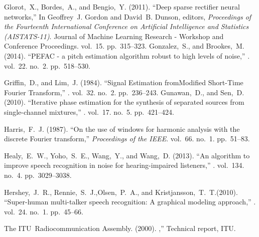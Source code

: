  Glorot,~X., Bordes,~A., and Bengio,~Y. (2011).
\newblock ``Deep sparse rectifier neural networks,'' \newblock In Geoffrey~J. Gordon
and David~B. Dunson, editors, {\em Proceedings of the Fourteenth International
Conference on Artificial Intelligence and Statistics (AISTATS-11)}. Journal of Machine Learning Research - Workshop and Conference
Proceedings. vol.~15. pp.~315--323.
 Gonzalez,~S., and Brookes,~M. (2014).
\newblock ``{PEFAC} - a pitch estimation algorithm robust to high levels of
noise,'' . vol.~22. no.~2. pp.~518--530.

 Griffin,~D., and Lim,~J. (1984). \newblock ``Signal
Estimation fromModified Short-Time Fourier Transform,'' . vol.~32. no.~2. pp.~236--243.
% 
 Gunawan,~D., and Sen,~D. (2010). \newblock
``{Iterative phase estimation for the synthesis of separated sources from
single-channel mixtures},'' .
vol.~17. no.~5. pp.~421--424.

 Harris,~F.~J. (1987). \newblock ``On the use of
windows for harmonic analysis with the discrete {Fourier} transform,'' \newblock
{\em Proceedings of the IEEE}. vol.~66. no.~1. pp.~51--83.

 Healy,~E.~W., Yoho,~S.~E., Wang,~Y., and Wang,~D. (2013).
\newblock ``{An algorithm to improve speech recognition in noise for
hearing-impaired listeners},'' . vol.~134. no.~4. pp.~3029--3038.

 Hershey,~J.~R., Rennie,~S.~J.,Olsen,~P.~A., and Kristjansson,~T.~T.(2010). \newblock ``Super-human multi-talker speech recognition: A
graphical modeling approach,'' .
vol.~24. no.~1. pp.~45--66.

 The ITU~Radiocommunication Assembly. (2000).
,'' \newblock Technical report, ITU.

